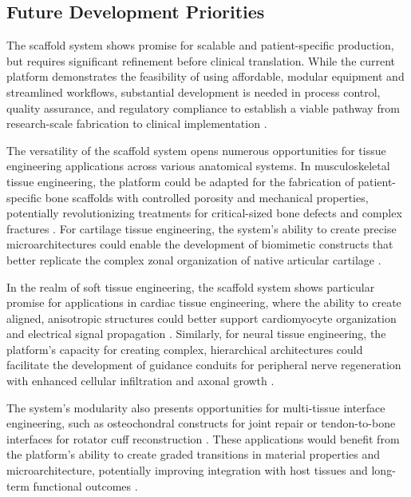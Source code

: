 \subsection{Future Development Priorities}

The scaffold system shows promise for scalable and patient-specific production, but requires significant refinement before clinical translation. While the current platform demonstrates the feasibility of using affordable, modular equipment and streamlined workflows, substantial development is needed in process control, quality assurance, and regulatory compliance to establish a viable pathway from research-scale fabrication to clinical implementation \cite{elkommos2025hybridhydrogels, patel2019systematicreview, xiao2013mechanicaltesting, makris2011kneemeniscus}.

The versatility of the scaffold system opens numerous opportunities for tissue engineering applications across various anatomical systems. In musculoskeletal tissue engineering, the platform could be adapted for the fabrication of patient-specific bone scaffolds with controlled porosity and mechanical properties, potentially revolutionizing treatments for critical-sized bone defects and complex fractures \cite{patel2019systematicreview, jin2022applicationsprospects, ashwin20203dpolylactic}. For cartilage tissue engineering, the system's ability to create precise microarchitectures could enable the development of biomimetic constructs that better replicate the complex zonal organization of native articular cartilage \cite{armiento2018biomaterialsarticular, moutos2007biomimeticthreedimensional, chae20213dcellprinting}.

In the realm of soft tissue engineering, the scaffold system shows particular promise for applications in cardiac tissue engineering, where the ability to create aligned, anisotropic structures could better support cardiomyocyte organization and electrical signal propagation \cite{rahmati2021electrospinningtissue, garreta2017tissueengineering, pok2013multilayeredscaffold}. Similarly, for neural tissue engineering, the platform's capacity for creating complex, hierarchical architectures could facilitate the development of guidance conduits for peripheral nerve regeneration with enhanced cellular infiltration and axonal growth \cite{patel2019systematicreview, chae20213dcellprinting, santhanam2018stemcell}.

The system's modularity also presents opportunities for multi-tissue interface engineering, such as osteochondral constructs for joint repair or tendon-to-bone interfaces for rotator cuff reconstruction \cite{armiento2018biomaterialsarticular, filardo2019patientspecificmeniscus, yang2016multilayeredpolycaprolactone}. These applications would benefit from the platform's ability to create graded transitions in material properties and microarchitecture, potentially improving integration with host tissues and long-term functional outcomes \cite{gupta2020meniscaltissue, li2024advancedhydrogel, gao2018electrospunfiber}.

